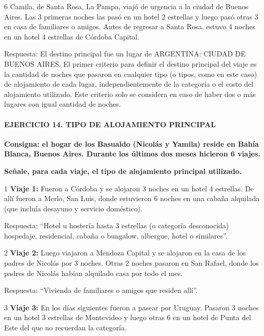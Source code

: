 \documentclass[
  openany]{book}
\begin{document}
6 Camila, de Santa Rosa, La Pampa, viajó de urgencia a la ciudad de Buenos Aires. Las 3 primeras noches las pasó en un hotel 2 estrellas y luego pasó otras 3 en casa de familiares o amigos. Antes de regresar a Santa Rosa, estuvo 4 noches en un hotel 4 estrellas de Córdoba Capital.

Respuesta: El destino principal fue un lugar de ARGENTINA: CIUDAD DE BUENOS AIRES. El primer criterio para definir el destino principal del viaje es la cantidad de noches que pasaron en cualquier tipo (o tipos, como en este caso) de alojamiento de cada lugar, independientemente de la categoría o el costo del alojamiento utilizado. Este criterio solo se considera en caso de haber dos o más lugares con igual cantidad de noches.

\hypertarget{ejercicio-14.-tipo-de-alojamiento-principal-1}{%
\paragraph{\texorpdfstring{\textbf{EJERCICIO 14. TIPO DE ALOJAMIENTO PRINCIPAL}}{EJERCICIO 14. TIPO DE ALOJAMIENTO PRINCIPAL}}\label{ejercicio-14.-tipo-de-alojamiento-principal-1}}

\textbf{Consigna: el hogar de los Basualdo (Nicolás y Yamila) reside en Bahía Blanca, Buenos Aires. Durante los últimos dos meses hicieron 6 viajes.}

\textbf{Señale, para cada viaje, el tipo de alojamiento principal utilizado.}

1 \textbf{Viaje 1:} Fueron a Córdoba y se alojaron 3 noches en un hotel 4 estrellas. De allí fueron a Merlo, San Luis, donde estuvieron 6 noches en una cabaña alquilada (que incluía desayuno y servicio doméstico).

Respuesta: ``Hotel u hostería hasta 3 estrellas (o categoría desconocida) hospedaje, residencial, cabaña o bungalow, albergue, hotel o similares''.

2 \textbf{Viaje 2:} Luego viajaron a Mendoza Capital y se alojaron en la casa de los padres de Nicolás por 3 noches. Otras 2 noches pasaron en San Rafael, donde los padres de Nicolás habían alquilado casa por todo el mes.

Respuesta: ``Vivienda de familiares o amigos que residen allí''.

3 \textbf{Viaje 3:} En los días siguientes fueron a pasear por Uruguay. Pasaron 3 noches en un hotel 3 estrellas de Montevideo y luego otras 6 en un hotel de Punta del Este del que no recuerdan la categoría.
\end{document}
